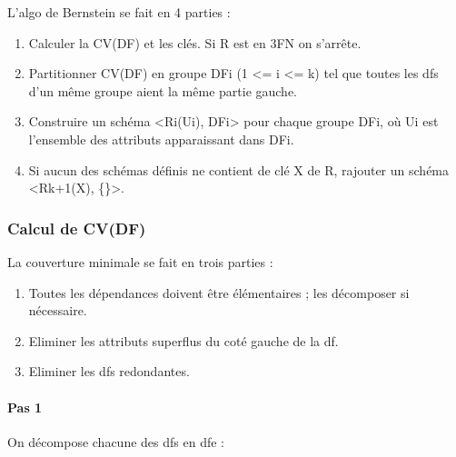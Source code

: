 \documentclass[a4paper,sffamily,12pt]{article}
\begin{document}
			\vspace{0.5cm}
	
			\noindent L'algo de Bernstein se fait en 4 parties :
		
				\begin{enumerate}[label=\ding{228}]
					\item Calculer la CV(DF) et les clés. Si R est en 3FN on s'arrête. 
					\item Partitionner CV(DF) en groupe DFi (1 <= i <= k) tel que toutes les dfs d'un même groupe aient la même partie gauche. 
					\item Construire un schéma <Ri(Ui), DFi> pour chaque groupe DFi, où Ui est l'ensemble des attributs apparaissant dans DFi.
					\item Si aucun des schémas définis ne contient de clé X de R, rajouter un schéma <Rk+1(X), \{\}>.
				\end{enumerate}	
				
			\subsubsection{Calcul de CV(DF)}
	
				\vspace{0.5cm}
	
				\noindent La couverture minimale se fait en trois parties :
	
				\begin{enumerate}[label=\ding{228}]
					\item Toutes les dépendances doivent être élémentaires ; les décomposer si nécessaire.
					\item Eliminer les attributs superflus du coté gauche de la df.
					\item Eliminer les dfs redondantes.
				\end{enumerate}	
				
				\vspace{0.5cm}
					
				\paragraph{Pas 1}
	
					\vspace{0.5cm}
	
					\noindent On décompose chacune des dfs en dfe : \\
	
\end{document}
